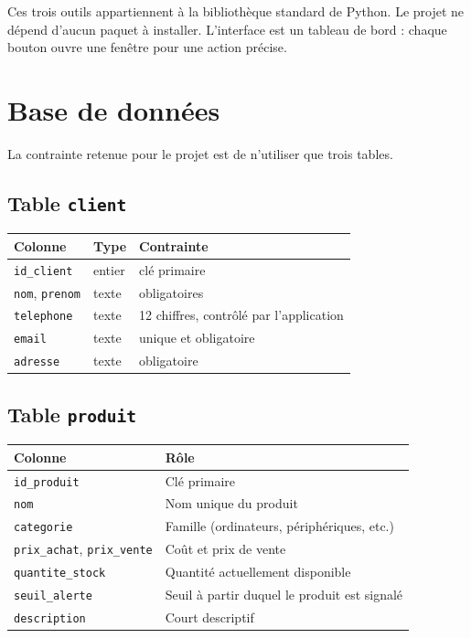 \documentclass[11pt,a4paper]{article}
\begin{document}
Ces trois outils appartiennent à la bibliothèque standard de Python. Le projet ne dépend d'aucun paquet à installer. L'interface est un tableau de bord : chaque bouton ouvre une fenêtre pour une action précise.

\section{Base de données}

La contrainte retenue pour le projet est de n'utiliser que trois tables.

\subsection{Table \texttt{client}}

\begin{center}
\begin{tabular}{@{}lll@{}}
\toprule
\textbf{Colonne} & \textbf{Type} & \textbf{Contrainte} \\
\midrule
\texttt{id\_client} & entier & clé primaire \\
\texttt{nom}, \texttt{prenom} & texte & obligatoires \\
\texttt{telephone} & texte & 12 chiffres, contrôlé par l'application \\
\texttt{email} & texte & unique et obligatoire \\
\texttt{adresse} & texte & obligatoire \\
\bottomrule
\end{tabular}
\end{center}

\subsection{Table \texttt{produit}}

\begin{center}
\begin{tabular}{@{}ll@{}}
\toprule
\textbf{Colonne} & \textbf{Rôle} \\
\midrule
\texttt{id\_produit} & Clé primaire \\
\texttt{nom} & Nom unique du produit \\
\texttt{categorie} & Famille (ordinateurs, périphériques, etc.) \\
\texttt{prix\_achat}, \texttt{prix\_vente} & Coût et prix de vente \\
\texttt{quantite\_stock} & Quantité actuellement disponible \\
\texttt{seuil\_alerte} & Seuil à partir duquel le produit est signalé \\
\texttt{description} & Court descriptif \\
\bottomrule
\end{tabular}
\end{center}
\end{document}
